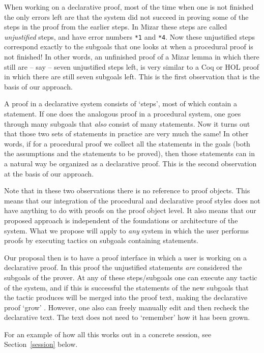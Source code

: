 \documentclass{LMCS}
\begin{document}
When working on a declarative proof, most of the time when one
is not finished the only errors left are that
the system
did not succeed in proving some of the steps in the proof from the earlier steps.
In Mizar these steps are called \emph{unjustified} steps, and have error
numbers \texttt{*1} and \texttt{*4}.
Now these unjustified steps correspond exactly
to the subgoals that one looks at when a procedural proof is
not finished!
In other words, an unfinished proof of a Mizar lemma in which there still are -- say --
seven unjustified steps left, is very similar to a Coq or HOL
proof in which there are still seven subgoals left.
This is the first observation that is the basis of our approach.

A proof in a declarative system consists of `steps', most of which contain
a statement.
If one does the analogous proof in a procedural system, one goes
through many subgoals that \emph{also} consist of many statements.
Now it turns out that those two sets of statements in practice are very much the same!
In other words, if for a procedural proof we collect all the statements in the goals (both the assumptions and the statements to be proved),
then those statements can in a natural way be organized as a declarative
proof.
This is the second observation at the basis of our approach.

Note that in these two observations there is no reference to
proof objects.
This means that our integration of the procedural and declarative
proof styles does not have anything to do with proofs on the proof object level.
It also means that our proposed approach is independent of the
foundations or architecture of the system.
What we propose will apply to \emph{any} system in which the user
performs proofs by executing tactics on subgoals containing
statements.

Our proposal then is to have a proof interface in which a user is
working on a declarative proof.
In this proof the unjustified statements \emph{are} considered the subgoals of
the prover.
At any of these steps/subgoals one can execute any tactic of the system,
and if this is successful the statements of the new
subgoals that the tactic produces will be merged into the proof text,
making the declarative proof `grow' \cite{kal:wie:09}.
However, one also can freely manually edit and then recheck the declarative text.
The text does not need to `remember' how it has been grown.

For an example of how all this works out in a concrete session,
see Section~\ref{session} below.
\end{document}
